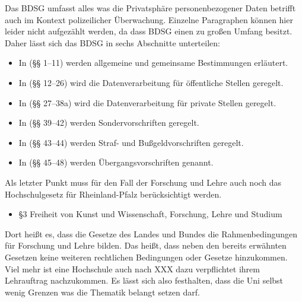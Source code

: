 \documentclass[10pt,a4paper]{article}
\begin{document}
Das BDSG umfasst alles was die Privatsphäre personenbezogener Daten betrifft auch im Kontext polizeilicher Überwachung. Einzelne Paragraphen können hier leider nicht aufgezählt werden, da dass BDSG einen zu großen Umfang besitzt. Daher lässt sich das BDSG in sechs Abschnitte unterteilen:
\begin{itemize}
	\item In (§§ 1–11) werden allgemeine und gemeinsame Bestimmungen erläutert.
	\item In (§§ 12–26) wird die Datenverarbeitung für öffentliche Stellen geregelt.
	\item In (§§ 27–38a) wird die Datenverarbeitung für private Stellen geregelt.
	\item In (§§ 39–42) werden Sondervorschriften geregelt.
	\item In (§§ 43–44) werden Straf- und Bußgeldvorschriften geregelt.
	\item In (§§ 45–48) werden Übergangsvorschriften genannt.
\end{itemize}
Als letzter Punkt muss für den Fall der Forschung und Lehre auch noch das Hochschulgesetz für Rheinland-Pfalz berücksichtigt werden. 
\begin{itemize}
	\item §3 Freiheit von Kunst und Wissenschaft, Forschung, Lehre und Studium
\end{itemize}
Dort heißt es, dass die Gesetze des Landes und Bundes die Rahmenbedingungen für Forschung und Lehre bilden. Das heißt, dass neben den bereits erwähnten Gesetzen keine weiteren rechtlichen Bedingungen oder Gesetze hinzukommen. Viel mehr ist eine Hochschule auch nach XXX dazu verpflichtet ihrem Lehrauftrag nachzukommen. Es lässt sich also festhalten, dass die Uni selbst wenig Grenzen was die Thematik belangt setzen darf.
\end{document}
